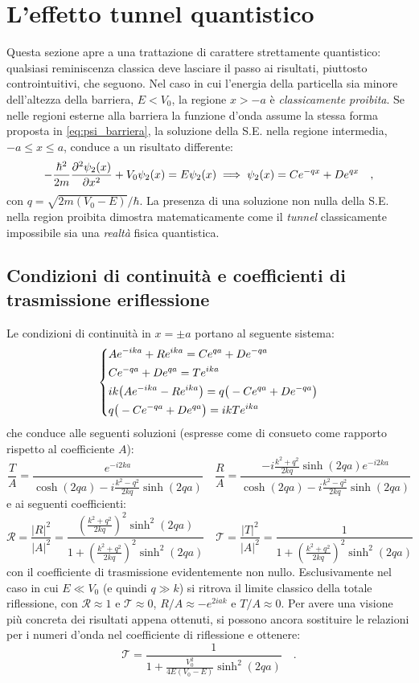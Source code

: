\section{L'effetto tunnel quantistico}
Questa sezione apre a una trattazione di carattere strettamente quantistico: qualsiasi reminiscenza classica deve lasciare il passo ai risultati, piuttosto controintuitivi, che seguono. Nel caso in cui l'energia della particella sia minore dell'altezza della barriera, $E < V_0$, la regione $x > -a$ è \emph{classicamente proibita}. Se nelle regioni esterne alla barriera la funzione d'onda assume la stessa forma proposta in \eqref{eq:psi_barriera}, la soluzione della S.E. nella regione intermedia, $-a \leq x \leq a$, conduce a un risultato differente:
\[  
    -\frac{\hbar^2}{2m}\pdv[2]{\psi_2(x)}{x} + V_0\psi_2(x) = E \psi_2(x) \implies \psi_2(x) = Ce^{-qx} + De^{qx} \quad,
\]
con $q = \sqrt{2m(V_0-E)}/\hbar$. La presenza di una soluzione non nulla della S.E. nella region proibita dimostra matematicamente come il \emph{tunnel} classicamente impossibile sia una \emph{realtà} fisica quantistica. 

\subsection{Condizioni di continuità e coefficienti di trasmissione eriflessione}
Le condizioni di continuità in $x = \pm a$ portano al seguente sistema: 
\[
\begin{dcases}
    Ae^{-ika} + Re^{ika} = Ce^{qa} + De^{-qa} \\
    Ce^{-qa} + De^{qa} = Te^{ika} \\
    ik\big(Ae^{-ika} - Re^{ika}\big) = q\big( -Ce^{qa} + De^{-qa} \big) \\
    q\big(-Ce^{-qa}+De^{qa}\big) = ikTe^{ika} 
\end{dcases}
\]
che conduce alle seguenti soluzioni (espresse come di consueto come rapporto rispetto al coefficiente $A$):
\[
    \frac{T}{A} = \frac{e^{-i2ka}}{\cosh(2qa) - i\frac{k^2 - q^2}{2kq}\sinh(2qa)} \quad
    \frac{R}{A} = \frac{-i\frac{k^2 + q^2}{2kq}\sinh(2qa) e^{-i2ka}}{\cosh(2qa) - i\frac{k^2 - q^2}{2kq}\sinh(2qa)} 
\]
e ai seguenti coefficienti:
\[
    \mathcal{R} = \frac{|R|^2}{|A|^2} = \frac{\left( \frac{k^2 + q^2}{2kq} \right)^2 \sinh^2(2qa)}{1 + \left( \frac{k^2 + q^2}{2kq} \right)^2 \sinh^2(2qa)} \quad
    \mathcal{T} = \frac{|T|^2}{|A|^2} = \frac{1}{1 + \left( \frac{k^2 + q^2}{2kq} \right)^2 \sinh^2(2qa)} 
\]
con il coefficiente di trasmissione evidentemente non nullo. Esclusivamente nel caso in cui $E \ll V_0$ (e quindi $q \gg k$) si ritrova il limite classico della totale riflessione, con $\mathcal{R} \approx 1$ e $\mathcal{T} \approx 0$, $R/A \approx -e^{2iak}$ e $T/A \approx 0$. Per avere una visione più concreta dei risultati appena ottenuti, si possono ancora sostituire le relazioni per i numeri d'onda nel coefficiente di riflessione e ottenere:
\[
    \mathcal{T} = \frac{1}{1 + \frac{V_0^2}{4E(V_0 - E)} \sinh^2(2qa)} \quad. 
\]  

